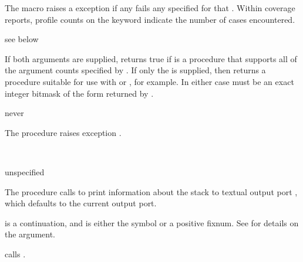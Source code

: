 The  macro raises a  exception if
any  fails any  specified for that .
Within coverage reports, profile counts on the 
keyword indicate the number of  cases encountered.

\begin{procedure}
\end{procedure}
\returns{} see below

If both arguments are supplied,  returns true if
 is a procedure that supports all of the argument counts specified by
.
If only the  is supplied, then 
returns a procedure 
suitable for use with  or , for example.
In either case  must be an exact integer bitmask of the
form returned by .

\begin{procedure}
\end{procedure}
\returns{} never

The  procedure raises exception .

\begin{procedure}
  \\
  \strut
\end{procedure}
\returns{} unspecified

The  procedure calls  to print information
about the stack to textual output port , which defaults to the current
output port.

 is a continuation, and  is either the symbol
 or a positive fixnum.
See \hyperlink{walk-stack}{} for details on the
 argument.

 calls .

